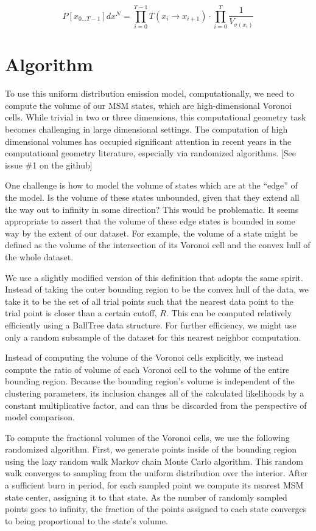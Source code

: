 \documentclass[twocolumn,floatfix,nofootinbib,aps]{revtex4-1}
\begin{document}
\begin{equation}
\label{eq:like_vol}
P[x_{0...T-1}] dx^N = \prod_{i=0}^{T-1} T(x_i \rightarrow x_{i+1}) \cdot \prod_{i=0}^T \frac{1}{V_{\sigma(x_{i})}}
\end{equation}

\section{Algorithm}

To use this uniform distribution emission model, computationally, we
need to compute the volume of our MSM states, which are high-dimensional
Voronoi cells. While trivial in two or three dimensions, this
computational geometry task becomes challenging in large dimensional
settings. The computation of high dimensional volumes has occupied significant
attention in recent years in the computational geometry literature, especially
via randomized algorithms. [See issue \#1 on the github]

One challenge is how to model the volume of states which are at the
``edge'' of the model. Is the volume of these states unbounded, given that they extend all the way out to infinity in some direction? This would be problematic.
It seems appropriate to assert that the volume of these edge states is bounded in some way by the extent of our dataset. For example, the volume of a state might be defined as the volume of the intersection of its Voronoi cell and the convex hull of the whole dataset.

We use a slightly modified version of this definition that adopts
the same spirit. Instead of taking the outer bounding region to be the convex hull of the data, we take it to be the set of all trial points such that the nearest data point to the trial point is closer than a certain cutoff, $R$. This can be computed relatively efficiently using a BallTree data structure. For further efficiency, we might use only a random subsample of the dataset for this nearest neighbor computation.

Instead of computing the volume of the Voronoi cells explicitly, we instead
compute the ratio of volume of each Voronoi cell to the volume of the entire
bounding region. Because the bounding region's volume is independent of the clustering parameters, its inclusion changes all of the calculated likelihoods by a constant multiplicative factor, and can thus be discarded from the perspective of model comparison.

To compute the fractional volumes of the Voronoi cells, we use the following randomized algorithm. First, we generate points inside of the bounding region using the lazy random walk Markov chain Monte Carlo algorithm.\cite{Kannan97} This random walk converges to sampling from the uniform distribution over the interior. After a sufficient burn in period, for each sampled point we compute its nearest MSM state center, assigning it to that state. As the number of randomly sampled points goes to infinity, the fraction of the points assigned to each state converges to being proportional to the state's volume.
\end{document}
